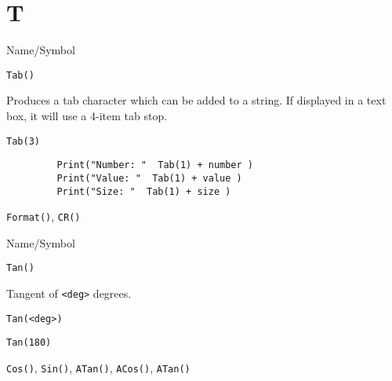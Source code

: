 \section{T}
\rl


\begin{desc}{Name/Symbol}

\item[Name/Symbol] \verb+Tab()+

\item[Description]  Produces a tab character which can be added to a
  string. If displayed in a text box, it will use a 4-item tab stop.

\item[Usage]        \verb!Tab(3)!


\item[Example]     
\begin{verbatim}
         Print("Number: "  Tab(1) + number )
         Print("Value: "  Tab(1) + value )
         Print("Size: "  Tab(1) + size )
\end{verbatim}
\item[See Also]
\verb+Format()+, \verb+CR()+
\end{desc}

\rl     

\begin{desc}{Name/Symbol}
\item[Name/Symbol]  	\verb+Tan()+	

\item[Description] 	Tangent of \verb+<deg>+ degrees.

\item[Usage]       	
\begin{verbatim}
Tan(<deg>)
\end{verbatim}

\item[Example]
\begin{verbatim}
Tan(180)
\end{verbatim}

\item[See Also]    	\verb+Cos()+, \verb+Sin()+, \verb+ATan()+, \verb+ACos()+, \verb+ATan()+ 
\end{desc}

\rl

